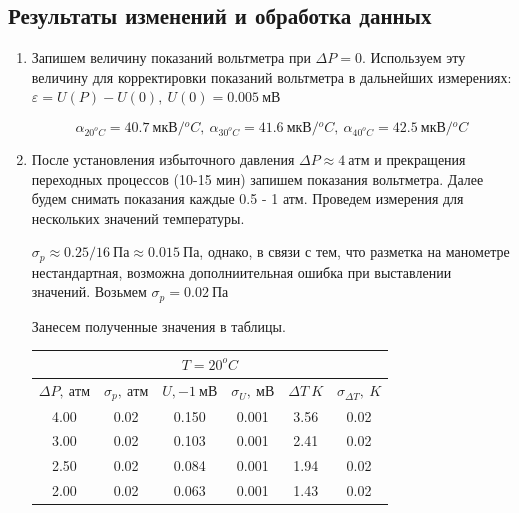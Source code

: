 \documentclass[12pt,a4paper]{article}
\begin{document}
\subsection*{Результаты изменений и обработка данных}
\begin{enumerate}
    \item Запишем величину показаний вольтметра при $\Delta P = 0$. 
    Используем эту величину для корректировки показаний вольтметра в дальнейших измерениях: $\varepsilon = U(P) - U(0),\ U(0) = 0.005\ мВ$

    $$\alpha_{20^oC} = 40.7\ мкВ/{^oC},\ \alpha_{30^oC} = 41.6\ мкВ/{^oC},\ \alpha_{40^oC} = 42.5\ мкВ/{^oC}$$
    \item После установления избыточного давления $\Delta P \approx 4\ атм$ и прекращения переходных процессов (10-15 мин) запишем показания вольтметра.
    Далее будем снимать показания каждые 0.5 - 1 атм. Проведем измерения для нескольких значений температуры.
    
    $\sigma_p \approx 0.25/16\ Па \approx 0.015\ Па$, однако, в связи с тем, что разметка на манометре нестандартная, возможна дополниительная ошибка при выставлении значений.
    Возьмем $\sigma_p = 0.02\ Па$
    
    Занесем полученные значения в таблицы.
    \begin{table}[htp]
        \centering
        \begin{tabular}[htp]{|c|c|c|c|c|c|}
            \hline
            \multicolumn{6}{|c|}{$T=20^oC$}\\
            \hline
            $\Delta P,\ атм$&$\sigma_p,\ атм$&$U,-1\ мВ$&$\sigma_U,\ мВ$&$\Delta T\ K$&$\sigma_{\Delta T},\ K$\\
            \hline
            4.00&0.02&0.150&0.001&3.56&0.02\\
            \hline
            3.00&0.02&0.103&0.001&2.41&0.02\\
            \hline
            2.50&0.02&0.084&0.001&1.94&0.02\\
            \hline
            2.00&0.02&0.063&0.001&1.43&0.02\\
            \hline
        \end{tabular}
    \end{table}


\end{enumerate}
\end{document}
